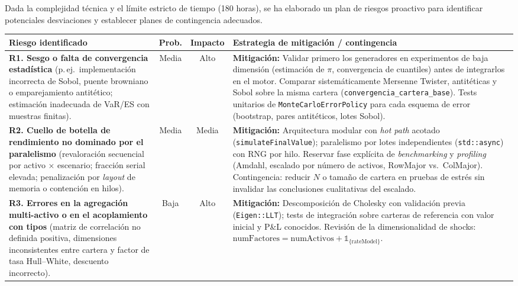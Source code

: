 \documentclass[11pt]{article}
\begin{document}
Dada la complejidad técnica y el límite estricto de tiempo (180 horas), se ha elaborado un plan de riesgos proactivo para identificar potenciales desviaciones y establecer planes de contingencia adecuados.


\vspace{1em}
\noindent
\begin{minipage}{\linewidth}
\centering
\small
\begin{tabular}{|p{4.5cm}|c|c|p{7.9cm}|}
\hline
\textbf{Riesgo identificado} & \textbf{Prob.} & \textbf{Impacto} & \textbf{Estrategia de mitigación / contingencia} \\ \hline

\textbf{R1. Sesgo o falta de convergencia estadística}
(p.\,ej.\ implementación incorrecta de Sobol, puente browniano o emparejamiento antitético; estimación inadecuada de VaR/ES con muestras finitas). &
Media & Alto &
\textbf{Mitigación:} Validar primero los generadores en experimentos de baja dimensión (estimación de $\pi$, convergencia de cuantiles) antes de integrarlos en el motor.
Comparar sistemáticamente Mersenne Twister, antitéticas y Sobol sobre la misma cartera (\texttt{convergencia\_cartera\_base}).
Tests unitarios de \texttt{MonteCarloErrorPolicy} para cada esquema de error (bootstrap, pares antitéticos, lotes Sobol). \\ \hline

\textbf{R2. Cuello de botella de rendimiento no dominado por el paralelismo}
(revaloración secuencial por activo $\times$ escenario; fracción serial elevada; penalización por \emph{layout} de memoria o contención en hilos). &
Media & Media &
\textbf{Mitigación:} Arquitectura modular con \emph{hot path} acotado (\texttt{simulateFinalValue}); paralelismo por lotes independientes (\texttt{std::async}) con RNG por hilo.
Reservar fase explícita de \textit{benchmarking} y \textit{profiling} (Amdahl, escalado por número de activos, RowMajor vs.\ ColMajor).
Contingencia: reducir $N$ o tamaño de cartera en pruebas de estrés sin invalidar las conclusiones cualitativas del escalado. \\ \hline

\textbf{R3. Errores en la agregación multi-activo o en el acoplamiento con tipos}
(matriz de correlación no definida positiva, dimensiones inconsistentes entre cartera y factor de tasa Hull--White, descuento incorrecto). &
Baja & Alto &
\textbf{Mitigación:} Descomposición de Cholesky con validación previa (\texttt{Eigen::LLT}); tests de integración sobre carteras de referencia con valor inicial y P\&L conocidos.
Revisión de la dimensionalidad de shocks: $\text{numFactores} = \text{numActivos} + \mathbb{1}_{\{\text{rateModel}\}}$. \\ \hline


\end{tabular}
\end{minipage}
\end{document}
